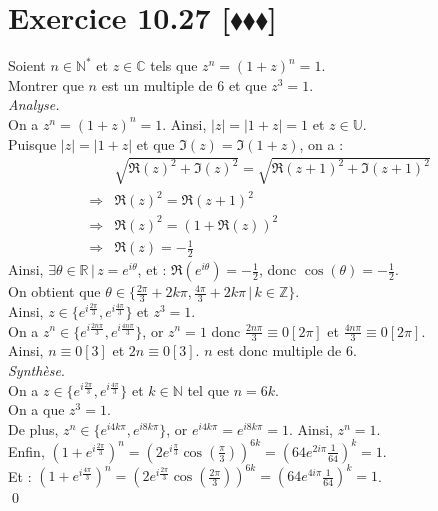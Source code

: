 \documentclass[10pt]{article}
\begin{document}
\section*{Exercice 10.27 [$\blacklozenge\blacklozenge\blacklozenge$]}
\begin{tcolorbox}[enhanced, width=7in, center, size=fbox, fontupper=\large, drop shadow southwest]
    Soient $n\in\mathbb{N}^*$ et $z\in\mathbb{C}$ tels que $z^n=(1+z)^n=1$.\\
    Montrer que $n$ est un multiple de $6$ et que $z^3=1$.\\[0.25cm]
    \emph{Analyse.}\\[0.1cm]
    On a $z^n = (1+z)^n = 1$. Ainsi, $|z|=|1+z|=1$ et $z\in\mathbb{U}$.\\[0.1cm]
    Puisque $|z|=|1+z|$ et que $\Im(z) = \Im(1+z)$, on a :
    \begin{align*}
        &\sqrt{\Re(z)^2 + \Im(z)^2} = \sqrt{\Re(z+1)^2 + \Im(z+1)^2}\\
        \Longrightarrow&\Re(z)^2=\Re(z+1)^2\\
        \Longrightarrow&\Re(z)^2=(1 + \Re(z))^2\\
        \Longrightarrow&\Re(z)=-\frac{1}{2}
    \end{align*}
    Ainsi, $\exists\theta\in\mathbb{R} \, | \, z=e^{i\theta}$, et : $\Re\left(e^{i\theta}\right)=-\frac{1}{2}$, donc $\cos(\theta)=-\frac{1}{2}$.\\[0.1cm]
    On obtient que $\theta\in\{\frac{2\pi}{3} + 2k\pi, \frac{4\pi}{3} + 2k\pi \, | \, k\in\mathbb{Z}\}$.\\[0.1cm]
    Ainsi, $z\in\{e^{i\frac{2\pi}{3}}, e^{i\frac{4\pi}{3}}\}$ et $z^3 = 1$.\\[0.1cm]
    On a $z^n\in\{e^{i\frac{2n\pi}{3}}, e^{i\frac{4n\pi}{3}}\}$, or $z^n=1$ donc $\frac{2n\pi}{3}\equiv0[2\pi]$ et $\frac{4n\pi}{3}\equiv0[2\pi]$.\\[0.1cm]
    Ainsi, $n \equiv 0[3]$ et $2n \equiv 0[3]$. $n$ est donc multiple de 6.\\[0.2cm]
    \emph{Synthèse}.\\[0.1cm]
    On a $z\in\{e^{i\frac{2\pi}{3}}, e^{i\frac{4\pi}{3}}\}$ et $k\in\mathbb{N}$ tel que $n=6k$.\\[0.1cm]
    On a que $z^3=1$.\\[0.1cm]
    De plus, $z^n\in\{e^{i4k\pi}, e^{i8k\pi}\}$, or $e^{i4k\pi} = e^{i8k\pi} = 1$. Ainsi, $z^n = 1$.\\[0.1cm]
    Enfin, $(1+e^{i\frac{2\pi}{3}})^n = (2e^{i\frac{\pi}{3}}\cos(\frac{\pi}{3}))^{6k}=(64e^{2i\pi}\frac{1}{64})^k=1$.\\[0.1cm]
    Et : $(1+e^{i\frac{4\pi}{3}})^n=(2e^{i\frac{2\pi}{3}}\cos(\frac{2\pi}{3}))^{6k}=(64e^{4i\pi}\frac{1}{64})^k=1$.\\
    \qed
\end{tcolorbox}
\end{document}
